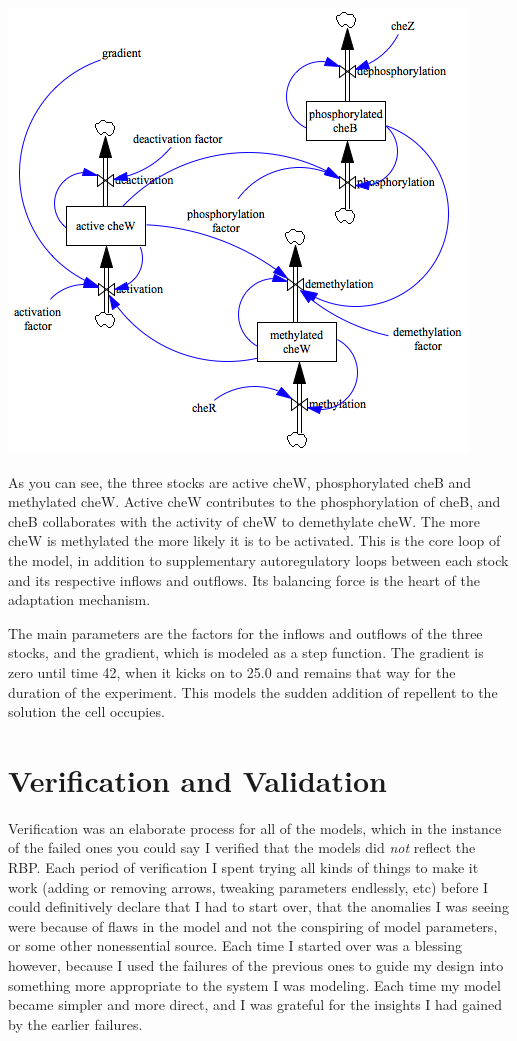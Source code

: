 \documentclass[12pt]{article}
\begin{document}
\includegraphics[scale=0.71]{autoregulation.png}

As you can see, the three stocks are active cheW, phosphorylated cheB and methylated cheW.  Active cheW contributes to the phosphorylation of cheB, and cheB collaborates with the activity of cheW to demethylate cheW.  The more cheW is methylated the more likely it is to be activated.  This is the core loop of the model, in addition to supplementary autoregulatory loops between each stock and its respective inflows and outflows.   Its balancing force is the heart of the adaptation mechanism.

The main parameters are the factors for the inflows and outflows of the three stocks, and the gradient, which is modeled as a step function.  The gradient is zero until time 42, when it kicks on to 25.0 and remains that way for the duration of the experiment.  This models the sudden addition of repellent to the solution the cell occupies.  

\section{Verification and Validation}

Verification was an elaborate process for all of the models, which in the instance of the failed ones you could say I verified that the models did {\em not} reflect the RBP.  Each period of verification I spent trying all kinds of things to make it work (adding or removing arrows, tweaking parameters endlessly, etc) before I could definitively declare that I had to start over, that the anomalies I was seeing were because of flaws in the model and not the conspiring of model parameters, or some other nonessential source.  Each time I started over was a blessing however, because I used the failures of the previous ones to guide my design into something more appropriate to the system I was modeling. Each time my model became simpler and more direct, and I was grateful for the insights I had gained by the earlier failures.   
\end{document}
